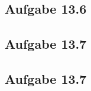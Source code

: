 \documentclass{standalone}
\begin{document}
\subsection{Aufgabe 13.6}


\subsection{Aufgabe 13.7}


\subsection{Aufgabe 13.7}
\end{document}

